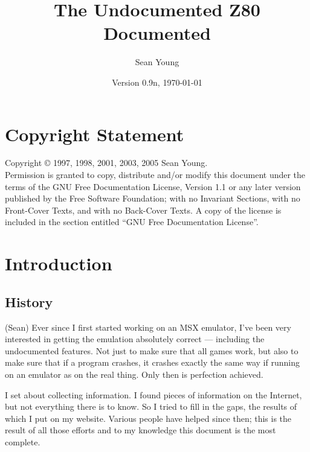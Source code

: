 \documentclass[oneside,a4paper]{book}
\begin{document}

\title{The Undocumented Z80 Documented}
\author{Sean Young}
\date{Version 0.9n, \today}

\maketitle

\frontmatter




\chapter*{Copyright Statement}

      Copyright {\copyright} 1997, 1998, 2001, 2003, 2005 Sean Young.\\
	
      Permission is granted to copy, distribute and/or modify this document
      under the terms of the GNU Free Documentation License, Version 1.1
      or any later version published by the Free Software Foundation;
      with no Invariant Sections, with no Front-Cover Texts, and with no 
      Back-Cover Texts. A copy of the license is included in the section 
      entitled ``GNU Free Documentation License''.

\tableofcontents

\mainmatter




\setcounter{page}{5}
\chapter{Introduction}

\section{History}

(Sean)
Ever since I first started working on an MSX emulator, I've been very 
interested in getting the emulation absolutely correct --- including the 
undocumented features. Not just to make sure that all games work, but 
also to make sure that if a program crashes, it crashes exactly the same 
way if running on an emulator as on the real thing. Only then is perfection 
achieved.

I set about collecting information. I found pieces of information on the
Internet, but not everything there is to know. So I tried to fill in the
gaps, the results of which I put on my website. Various people have helped
since then; this is the result of all those efforts and to my knowledge 
this document is the most complete.\\\\
\end{document}
